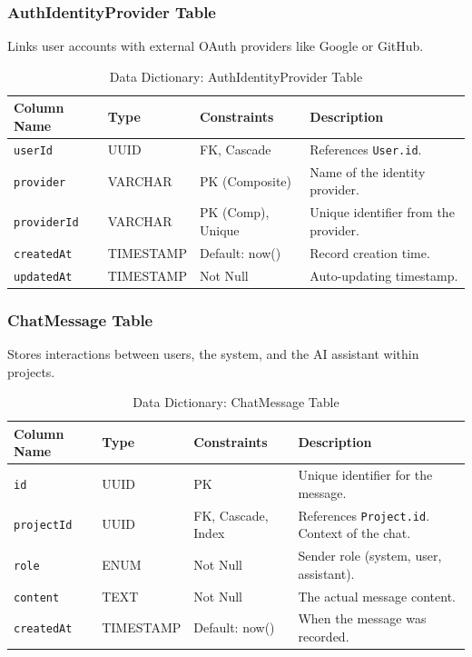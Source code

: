 \subsubsection{AuthIdentityProvider Table}
Links user accounts with external OAuth providers like Google or GitHub.
\begin{table}[H]
\centering
\renewcommand{\arraystretch}{1.3}
\begin{tabularx}{\textwidth}{|l|l|l|X|}
\hline
\textbf{Column Name} & \textbf{Type} & \textbf{Constraints} & \textbf{Description} \\
\hline
\texttt{userId} & UUID & FK, Cascade & References \texttt{User.id}. \\
\hline
\texttt{provider} & VARCHAR & PK (Composite) & Name of the identity provider. \\
\hline
\texttt{providerId} & VARCHAR & PK (Comp), Unique & Unique identifier from the provider. \\
\hline
\texttt{createdAt} & TIMESTAMP & Default: now() & Record creation time. \\
\hline
\texttt{updatedAt} & TIMESTAMP & Not Null & Auto-updating timestamp. \\
\hline
\end{tabularx}
\caption{Data Dictionary: AuthIdentityProvider Table}
\label{tab:dict-authidp}
\end{table}

\subsubsection{ChatMessage Table}
Stores interactions between users, the system, and the AI assistant within projects.
\begin{table}[H]
\centering
\renewcommand{\arraystretch}{1.3}
\begin{tabularx}{\textwidth}{|l|l|l|X|}
\hline
\textbf{Column Name} & \textbf{Type} & \textbf{Constraints} & \textbf{Description} \\
\hline
\texttt{id} & UUID & PK & Unique identifier for the message. \\
\hline
\texttt{projectId} & UUID & FK, Cascade, Index & References \texttt{Project.id}. Context of the chat. \\
\hline
\texttt{role} & ENUM & Not Null & Sender role (system, user, assistant). \\
\hline
\texttt{content} & TEXT & Not Null & The actual message content. \\
\hline
\texttt{createdAt} & TIMESTAMP & Default: now() & When the message was recorded. \\
\hline
\end{tabularx}
\caption{Data Dictionary: ChatMessage Table}
\label{tab:dict-chatmessage}
\end{table}

